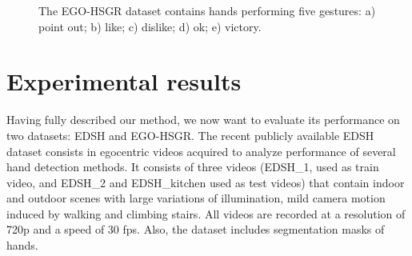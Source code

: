 \begin{figure}[tb]
\centering
{}
\caption{The EGO-HSGR dataset contains hands performing five gestures: a) point out; b) like; c) dislike; d) ok; e) victory.}
\label{fig:gesture_samples}
\end{figure}

\section{Experimental results}
Having fully described our method, we now want to evaluate its performance on two datasets: EDSH and EGO-HSGR.
The recent publicly available EDSH dataset \cite{li13} consists in egocentric videos acquired to analyze performance of several hand detection methods. It consists of three videos (EDSH\_1, used as train video, and EDSH\_2 and EDSH\_{kitchen} used as test videos) that contain indoor and outdoor scenes with large variations of illumination, mild camera motion induced by walking and climbing stairs. All videos are recorded at a resolution of 720p and a speed of 30 fps. Also, the dataset includes segmentation masks of hands.    

